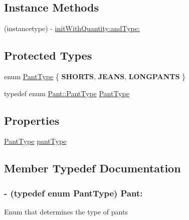 \subsection*{Instance Methods}
\begin{DoxyCompactItemize}
\item 
(instancetype) -\/ \hyperlink{interface_pant_a1be7bfb6c6838da210d39538f273ea00}{init\-With\-Quantity\-:and\-Type\-:}
\end{DoxyCompactItemize}
\subsection*{Protected Types}
\begin{DoxyCompactItemize}
\item 
enum \hyperlink{interface_pant_a6b3d261fc9bd1f1502f11926fb34fc3c}{Pant\-Type} \{ {\bfseries S\-H\-O\-R\-T\-S}, 
{\bfseries J\-E\-A\-N\-S}, 
{\bfseries L\-O\-N\-G\-P\-A\-N\-T\-S}
 \}
\item 
typedef enum \hyperlink{interface_pant_a6b3d261fc9bd1f1502f11926fb34fc3c}{Pant\-::\-Pant\-Type} \hyperlink{interface_pant_aae29dca1b56ea6999dcab09c51db0442}{Pant\-Type}
\end{DoxyCompactItemize}
\subsection*{Properties}
\begin{DoxyCompactItemize}
\item 
\hyperlink{interface_pant_a6b3d261fc9bd1f1502f11926fb34fc3c}{Pant\-Type} \hyperlink{interface_pant_a381c3b3606c1c88b2606945e382509fc}{pant\-Type}
\end{DoxyCompactItemize}


\subsection{Member Typedef Documentation}
\hypertarget{interface_pant_aae29dca1b56ea6999dcab09c51db0442}{
\subsubsection[{Pant\-Type}]{\setlength{\rightskip}{0pt plus 5cm}-\/ (typedef enum {\bf Pant\-Type})  Pant\-:\hspace{0.3cm}{\ttfamily [protected]}}}\label{interface_pant_aae29dca1b56ea6999dcab09c51db0442}
Enum that determines the type of pants 

